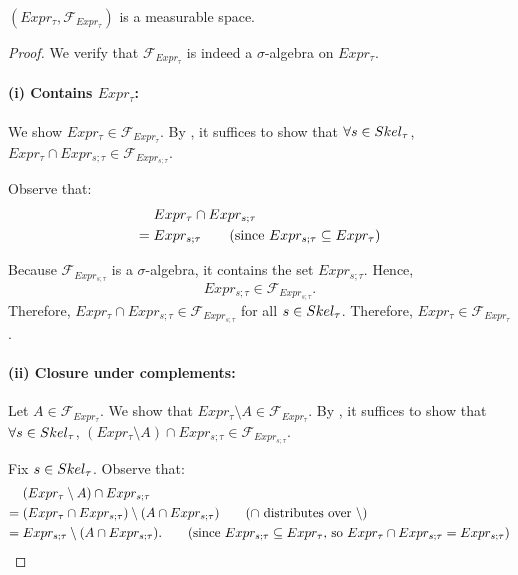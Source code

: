 \begin{lemma}\label{lem:measurable-expr-t}
	$(Expr_{\tau}, \mathcal{F}_{Expr_{\tau}})$ is a measurable space.
\end{lemma}

\begin{proof}
	We verify that $\mathcal{F}_{Expr_{\tau}}$ is indeed a $\sigma$-algebra on $Expr_{\tau}$.

	\paragraph{(i) Contains $Expr_{\tau}$:}
	
	We show $Expr_{\tau} \in \mathcal{F}_{Expr_\tau}$. By , it suffices to show that $\forall s \in Skel_\tau$, $Expr_{\tau} \cap Expr_{s;\tau} \in \mathcal{F}_{Expr_{s;\tau}}$.

	Observe that:
	\begin{align*}
		&Expr_{\tau} \cap Expr_{s;\tau} \\
		=\; &Expr_{s;\tau} \tag{since $Expr_{s;\tau} \subseteq Expr_{\tau}$}
	\end{align*}

	Because $\mathcal{F}_{Expr_{s;\tau}}$ is a $\sigma$-algebra, it contains the set $Expr_{s;\tau}$. Hence,
	\[
		Expr_{s;\tau} \in \mathcal{F}_{Expr_{s;\tau}}.
	\]
	Therefore, $Expr_{\tau} \cap Expr_{s;\tau} \in \mathcal{F}_{Expr_{s;\tau}}$ for all $s \in Skel_{\tau}$. Therefore, $Expr_{\tau} \in \mathcal{F}_{Expr_\tau}$.

	\paragraph{(ii) Closure under complements:}

	Let $A \in \mathcal{F}_{Expr_\tau}$. We show that $Expr_\tau \setminus A \in \mathcal{F}_{Expr_\tau}$. By , it suffices to show that $\forall s \in Skel_\tau$, $(Expr_\tau \setminus A) \cap Expr_{s;\tau} \in \mathcal{F}_{Expr_{s;\tau}}$.
	
	Fix $s \in Skel_\tau$.  Observe that:
	\begin{align*}
		&(Expr_\tau \setminus A) \cap Expr_{s;\tau} \\
		=\; &(Expr_\tau \cap Expr_{s;\tau}) \setminus (A \cap Expr_{s;\tau}) \tag{$\cap$ distributes over $\setminus$} \\
		=\; &Expr_{s;\tau} \setminus (A \cap Expr_{s;\tau}). \tag{since $Expr_{s;\tau} \subseteq Expr_\tau$, so $Expr_\tau \cap Expr_{s;\tau} = Expr_{s;\tau}$}
	\end{align*}


\end{proof}
